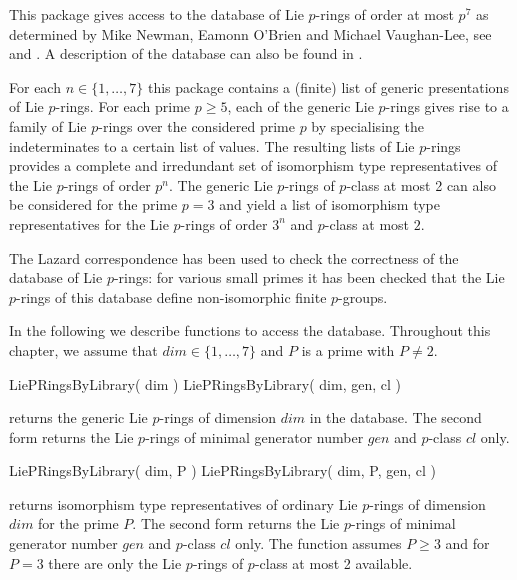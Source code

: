 

This package gives access to the database of Lie $p$-rings of order at most
$p^7$ as determined by Mike Newman, Eamonn O'Brien and Michael Vaughan-Lee,
see \cite{NOV04} and \cite{OVL05}. A description of the database can also be 
found in \cite{Notes}.
\medskip

For each $n \in \{1, \ldots, 7\}$ this package contains a (finite) list of 
generic presentations of Lie $p$-rings. For each prime $p \geq 5$, each
of the generic Lie $p$-rings gives rise to a family of Lie $p$-rings over
the considered prime $p$ by specialising the indeterminates to a certain list
of values. The resulting lists of Lie $p$-rings provides a complete and
irredundant set of isomorphism type representatives of the Lie $p$-rings of
order $p^n$. The generic Lie $p$-rings of $p$-class at most 2 can also be
considered for the prime $p=3$ and yield a list of isomorphism type
representatives for the Lie $p$-rings of order $3^n$ and $p$-class at most 
$2$.
\medskip

The Lazard correspondence has been used to check the correctness of the
database of Lie $p$-rings: for various small primes it has been checked
that the Lie $p$-rings of this database define non-isomorphic finite
$p$-groups.
\medskip

In the following we describe functions to access the database. Throughout 
this chapter, we assume that $dim \in \{1, \ldots, 7\}$ and $P$ is a prime 
with $P \neq 2$.


\> LiePRingsByLibrary( dim )
\> LiePRingsByLibrary( dim, gen, cl )

returns the generic Lie $p$-rings of dimension $dim$ in the database. The
second form returns the Lie $p$-rings of minimal generator number $gen$ 
and $p$-class $cl$ only. 

\> LiePRingsByLibrary( dim, P )
\> LiePRingsByLibrary( dim, P, gen, cl )

returns isomorphism type representatives of ordinary Lie $p$-rings of 
dimension $dim$ for the prime $P$. The second form returns the Lie $p$-rings 
of minimal generator number $gen$ and $p$-class $cl$ only. The function 
assumes $P \geq 3$ and for $P = 3$ there are only the Lie $p$-rings of 
$p$-class at most 2 available.


